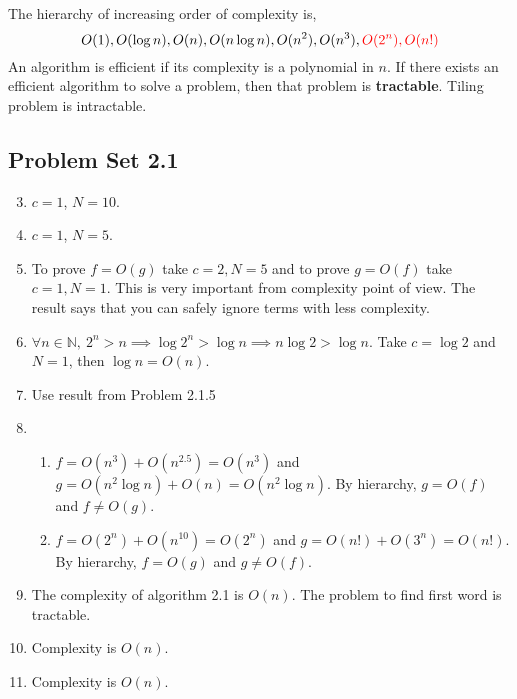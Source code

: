 The hierarchy of increasing order of complexity is, 
$$O(1), O(\log n), O(n), O(n\log n), O(n^2), O(n^3), \textcolor{red}{O(2^n), O(n!)}$$
An algorithm is efficient if its complexity is a polynomial in $n$. If there exists an efficient algorithm to solve a problem, then that problem is \textbf{tractable}. Tiling problem is intractable.

\subsection*{Problem Set 2.1}
\begin{enumerate}
	\setcounter{enumi}{2}
	\item $c = 1$, $N = 10$.
	\item $c = 1$, $N = 5$.
	\item To prove $f = O(g)$ take $c = 2, N = 5$ and to prove $g = O(f)$ take $c = 1, N = 1$.
		This is very important from complexity point of view. The result says that you can safely ignore terms with less complexity.
	\item $\forall n \in \mathbb{N},\ 2^n > n \implies \log 2^n > \log n \implies n\log 2 > \log n$.
		Take $c = \log 2$ and $N = 1$, then $\log n = O(n)$.
	\item Use result from Problem 2.1.5 \begin{enumerate*} \item $f = O(n^5)$ \item $f = O(n^3\log n)$ \item $f = O(2^n)$ \end{enumerate*}
	\item %
	\begin{enumerate}
		\item $f = O(n^3)+O(n^{2.5}) = O(n^3)$ and $g = O(n^2\log n)+O(n) = O(n^2 \log n)$. By hierarchy, $g = O(f)$ and $f \ne O(g)$.
		\item $f = O(2^n) + O(n^{10}) = O(2^n)$ and $g = O(n!) + O(3^n) = O(n!)$. By hierarchy, $f = O(g)$ and $g \ne O(f)$.
	\end{enumerate}
	\item The complexity of algorithm 2.1 is $O(n)$. The problem to find first word is tractable.
	\item Complexity is $O(n)$.
	\item Complexity is $O(n)$.
\end{enumerate}
